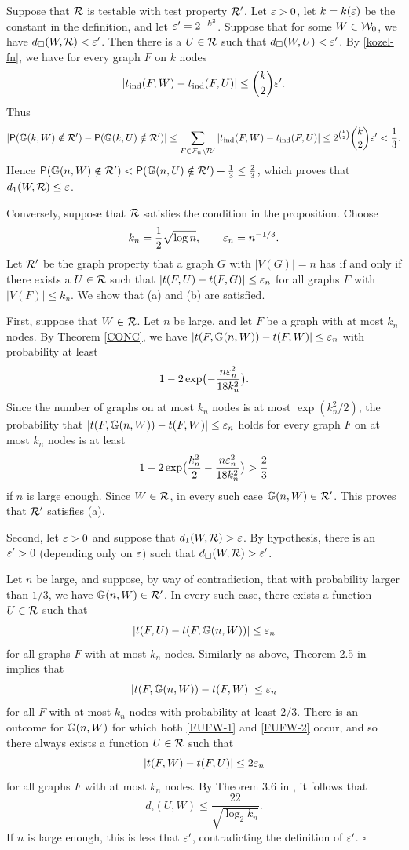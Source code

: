 \documentclass{article}
\newenvironment{proof}{\medskip\noindent{\bf Proof. }}{\hfill$\square$\medskip}
\begin{document}
\begin{proof}
Suppose that $\mathcal{R}$ is testable with test property $\mathcal{R}'$. Let
$\varepsilon>0$, let $k=k(\varepsilon)$ be the constant in the definition, and let
$\varepsilon'=2^{-k^2}$. Suppose that for some $W\in\mathcal{W}_0$, we have
$d_\square(W,\mathcal{R})<\varepsilon'$. Then there is a $U\in\mathcal{R}$ such that
$d_\square(W,U)<\varepsilon'$. By \eqref{kozel-fn}, we have for every graph
$F$ on $k$ nodes
\[
|t_{\rm ind}(F,W)-t_{\rm ind}(F,U)|\le \binom{k}{2}\varepsilon'.
\]
Thus
\[
|{\sf P}({\mathbb G}(k,W)\notin\mathcal{R}')-{\sf P}({\mathbb G}(k,U)\notin\mathcal{R}')| \le
\sum_{F\in\mathcal{F}_n\setminus\mathcal{R}'} |t_{\rm ind}(F,W)-t_{\rm ind}(F,U)|\le
2^{\binom{k}{2}}\binom{k}{2}\varepsilon'<\frac13.
\]
Hence ${\sf P}({\mathbb G}(n,W)\notin\mathcal{R}') <{\sf P}({\mathbb G}(n,U)\notin\mathcal{R}')
+\frac13\le\frac23$, which proves that $d_1(W,\mathcal{R})\le\varepsilon$.

Conversely, suppose that $\mathcal{R}$ satisfies the condition in the
proposition. Choose
\[
k_n=\frac12\sqrt{\log n}, \qquad \varepsilon_n= n^{-1/3}.
\]
Let $\mathcal{R}'$ be the graph property that a graph $G$ with $|V(G)|=n$ has
if and only if there exists a $U\in\mathcal{R}$ such that
$|t(F,U)-t(F,G)|\le\varepsilon_n$ for all graphs $F$ with $|V(F)|\le k_n$.
We show that (a) and (b) are satisfied.

First, suppose that $W\in\mathcal{R}$. Let $n$ be large, and let $F$ be a
graph with at most $k_n$ nodes. By Theorem \ref{CONC}, we have
$|t(F,{\mathbb G}(n,W))-t(F,W)|\le \varepsilon_n$ with probability at least
\[
1-2\exp\bigl(-\frac{n\varepsilon_n^2}{18k_n^2}\bigr).
\]
Since the number of graphs on at most $k_n$ nodes is at most
$\exp(k_n^2/2)$, the probability that $|t(F,{\mathbb G}(n,W))-t(F,W)|\le
\varepsilon_n$ holds for every graph $F$ on at most $k_n$ nodes is at least
\[
1-2\exp\bigl(\frac{k_n^2}2-\frac{n\varepsilon_n^2}{18k_n^2}\bigr)>\frac23
\]
if $n$ is large enough. Since $W\in\mathcal{R}$, in every such case
${\mathbb G}(n,W)\in\mathcal{R}'$. This proves that $\mathcal{R}'$ satisfies (a).

Second, let $\varepsilon>0$ and suppose that $d_1(W,\mathcal{R})>\varepsilon$. By
hypothesis, there is an $\varepsilon'>0$ (depending only on $\varepsilon$) such
that $d_\square(W,\mathcal{R})>\varepsilon'$.

Let $n$ be large, and suppose, by way of contradiction, that with
probability larger than $1/3$, we have ${\mathbb G}(n,W)\in\mathcal{R}'$. In every
such case, there exists a function $U\in\mathcal{R}$ such that
\begin{equation}\label{FUFW-1}
|t(F,U)-t(F,{\mathbb G}(n,W))|\le \varepsilon_n
\end{equation}
for all graphs $F$ with at most $k_n$ nodes. Similarly as above,
Theorem 2.5 in \cite{LSz} implies that
\begin{equation}\label{FUFW-2}
|t(F,{\mathbb G}(n,W))-t(F,W)| \le \varepsilon_n
\end{equation}
for all $F$ with at most $k_n$ nodes with probability at least $2/3$.
There is an outcome for ${\mathbb G}(n,W)$ for which both \eqref{FUFW-1} and
\eqref{FUFW-2} occur, and so there always exists a function $U\in\mathcal{R}$
such that
\[
|t(F,W)-t(F,U)|\le 2\varepsilon_n
\]
for all graphs $F$ with at most $k_n$ nodes. By Theorem 3.6 in
\cite{BCLSV1}, it follows that
\[
d_\square(U,W) \le \frac{22}{\sqrt{\log_2k_n}}.
\]
If $n$ is large enough, this is less that $\varepsilon'$, contradicting the
definition of $\varepsilon'$.
\end{proof}
\end{document}
